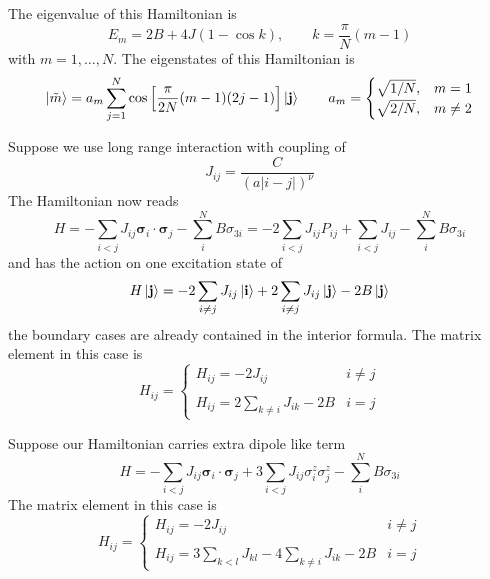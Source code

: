\documentclass[../../../main.tex]{subfiles}
\begin{document}
The eigenvalue of this Hamiltonian is
\begin{equation*}
    E_m = 2B + 4J (1 - \cos k),\qquad k = \frac{\pi     }{N     } (m-1)
\end{equation*}
with $m=1,\dots,N$.
The eigenstates of this Hamiltonian is
\begin{equation*}
    \ket{\tilde{m }} = a_m \sum_{j=1} ^{N} \cos \left[ \frac{\pi }{2N }(m-1 ) (2j-1)\right]  \ket{\mathbf{j}} \qquad
    a_m = \begin{cases}
        \sqrt{1/N}, & m=1      \\
        \sqrt{2/N}, & m \neq 2 \\
    \end{cases}
\end{equation*}

Suppose we use long range interaction with coupling of
\begin{equation*}
    J_{ij} = \frac{C}{\left(a|i-j|\right)^\nu}
\end{equation*}
The Hamiltonian now reads
\begin{equation*}
    H =  - \sum_{i<j} J_{ij} \boldsymbol{\sigma}_i \cdot\boldsymbol{\sigma}_{j} - \sum_{i } ^N B \sigma_{3i}
    =  -2\sum_{i<j}J_{ij}  P_{ij} + \sum_{i<j} J_{ij} - \sum_{i } ^N B \sigma_{3i}
\end{equation*}
and has the action on one excitation state of
\begin{equation*}
    H \ket{\mathbf{j} } =
    -2\sum_{i \neq j}J_{ij}  \ket{\mathbf{i}} +2 \sum_{i \neq j}  J_{ij}\ket{\mathbf{j}} -2B\ket{\mathbf{j}}
\end{equation*}
the boundary cases are already contained in the interior formula.
The matrix element in this case is
\begin{equation*}
    H_{ij} =
    \begin{cases}
        H_{ij} = -2 J_{ij}                     & i\neq j \\\\
        H_{ij} = 2 \sum_{k \neq i}  J_{ik} -2B & i=j
    \end{cases}
\end{equation*}

Suppose our Hamiltonian carries extra dipole like term
\begin{equation*}
    H =  - \sum_{i<j} J_{ij} \boldsymbol{\sigma}_i \cdot\boldsymbol{\sigma}_{j} + 3\sum_{i<j} J_{ij} \sigma^z_i \sigma^z_j  - \sum_{i } ^N B \sigma_{3i}
\end{equation*}
The matrix element in this case is
\begin{equation*}
    H_{ij} =
    \begin{cases}
        H_{ij} = -2 J_{ij}                                           & i\neq j \\\\
        H_{ij} =  3 \sum_{k<l} J_{kl} - 4\sum_{k \neq i}  J_{ik} -2B & i=j
    \end{cases}
\end{equation*}
\end{document}
